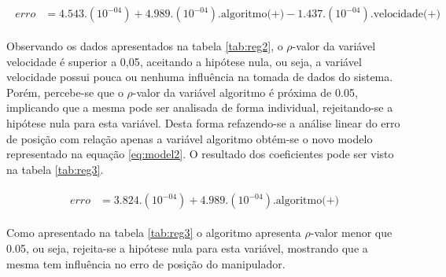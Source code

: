\begin{align}
    \begin{split}
    erro &= 4.543.(10^{-04}) + 4.989.(10^{-04})  \text{.algoritmo(+)} - 1.437.(10^{-04})  \text{.velocidade(+)}
    \end{split}
    \label{eq:model1}
\end{align}

Observando os dados apresentados na tabela \ref*{tab:reg2}, o $\rho$-valor da variável velocidade é superior a 0,05, aceitando a hipótese nula, ou seja, a variável velocidade possui pouca ou nenhuma influência na tomada de dados do sistema. Porém, percebe-se que o $\rho$-valor da variável algoritmo é próxima de 0.05, implicando que a mesma pode ser analisada de forma individual, rejeitando-se a hipótese nula para esta variável. Desta forma refazendo-se a análise linear do erro de posição com relação apenas a variável algoritmo obtém-se o novo modelo representado na equação \ref*{eq:model2}. O resultado dos coeficientes pode ser visto na tabela \ref*{tab:reg3}.

\begin{table}[h!]
  \centering
  \caption{Resultados da análise de regressão linear (variável algoritmo).}
    \label{tab:reg3}
  \end{table}

\begin{align}
    \begin{split}
    erro &= 3.824.(10^{-04}) + 4.989.(10^{-04})  \text{.algoritmo(+)}
    \end{split}
    \label{eq:model2}
\end{align}

Como apresentado na tabela \ref*{tab:reg3} o algoritmo apresenta $\rho$-valor menor que 0.05, ou seja, rejeita-se a hipótese nula para esta variável, mostrando que a mesma tem influência no erro de posição do manipulador. 

